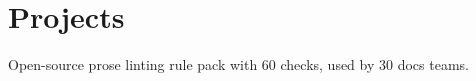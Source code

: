 \documentclass[]{deedy-resume-openfont}
\begin{document}
\begin{minipage}[t]{0.66\textwidth}
\section{Projects}
\begin{tightemize}
\item Open-source prose linting rule pack with 60 checks, used by 30 docs teams. %
\end{tightemize}
\sectionsep

\end{minipage}
\end{document}
